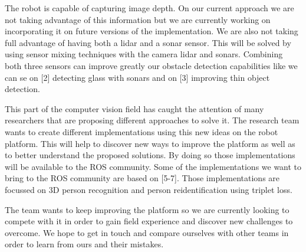 The robot is capable of capturing image depth.
On our current approach we are not taking advantage of this information but we are currently working on incorporating it on future versions of the implementation.
We are also not taking full advantage of having both a lidar and a sonar sensor.
This will be solved by using sensor mixing techniques with the camera lidar and sonars.
Combining both three sensors can improve greatly our obstacle detection capabilities like we can se on [2] detecting glass with sonars and on [3] improving thin object detection. 

This part of the computer vision field has caught the attention of many researchers that are proposing different approaches to solve it.
The research team wants to create different implementations using this new ideas on the robot platform.
This will help to discover new ways to improve the platform as well as to better understand the proposed solutions.
By doing so those implementations will be available to the ROS community.
Some of the implementations we want to bring to the ROS community are based on [5-7].
Those implementations are focussed on 3D person recognition and person reidentification using triplet loss.

The team wants to keep improving the platform so we are currently looking to compete with it in order to gain field experience and discover new challenges to overcome.
We hope to get in touch and compare ourselves with other teams in order to learn from ours and their mistakes.

\newpage



\newpage
\robospecs

\nocite{*}

